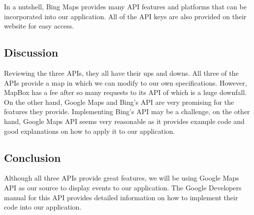 \documentclass[onecolumn, draftclsnofoot,10pt, compsoc]{IEEEtran}
\begin{document}
In a nutshell, Bing Maps provides many API features and platforms that can be incorporated into our application. All of the API keys are also provided on their website for easy access. 

\subsection{Discussion}
Reviewing the three APIs, they all have their ups and downs. All three of the APIs provide a map in which we can modify to our own specifications. However, MapBox has a fee after so many requests to its API of which is a huge downfall. On the other hand, Google Maps and Bing's API are very promising for the features they provide. Implementing Bing's API may be a challenge, on the other hand, Google Maps API seems very reasonable as it provides example code and good explanations on how to apply it to our application. 
\subsection{Conclusion}
Although all three APIs provide great features, we will be using Google Maps API as our source to display events to our application. The Google Developers manual for this API provides detailed information on how to implement their code into our application. 
 

\clearpage


\end{document}
